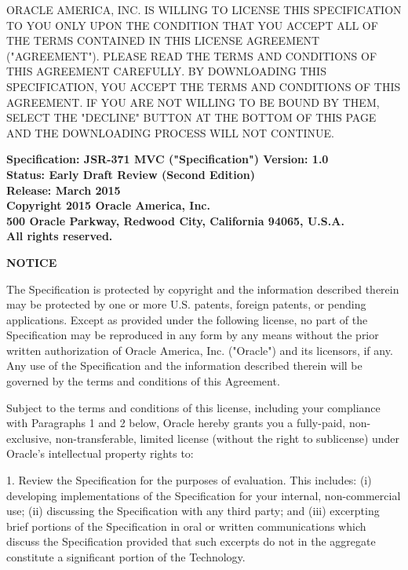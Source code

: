\begin{flushleft}

\vspace{1em}

ORACLE AMERICA, INC. IS WILLING TO LICENSE THIS SPECIFICATION TO YOU ONLY UPON THE CONDITION THAT YOU ACCEPT ALL OF THE TERMS CONTAINED IN THIS LICENSE AGREEMENT ("AGREEMENT"). PLEASE READ THE TERMS AND CONDITIONS OF THIS AGREEMENT CAREFULLY. BY DOWNLOADING THIS SPECIFICATION, YOU ACCEPT THE TERMS AND CONDITIONS OF THIS AGREEMENT. IF YOU ARE NOT WILLING TO BE BOUND BY THEM, SELECT THE "DECLINE" BUTTON AT THE BOTTOM OF THIS PAGE AND THE DOWNLOADING PROCESS WILL NOT CONTINUE. 

\vspace{1em}

{\bfseries
Specification: JSR-371 MVC ("Specification") Version: 1.0 \\
Status: Early Draft Review (Second Edition) \\
Release: March 2015 \\
Copyright 2015 Oracle America, Inc. \\
500 Oracle Parkway, Redwood City, California 94065, U.S.A. \\
All rights reserved.\\
}

\vspace{1em}
{\bfseries NOTICE}

The Specification is protected by copyright and the information described therein may be protected by one or more U.S. patents, foreign patents, or pending applications. Except as provided under the following license, no part of the Specification may be reproduced in any form by any means without the prior written authorization of Oracle America, Inc. ("Oracle") and its licensors, if any. Any use of the Specification and the information described therein will be governed by the terms and conditions of this Agreement.

Subject to the terms and conditions of this license, including your compliance with Paragraphs 1 and 2 below, Oracle hereby grants you a fully-paid, non-exclusive, non-transferable, limited license (without the right to sublicense) under Oracle's intellectual property rights to:

1. Review the Specification for the purposes of evaluation. This includes: (i) developing implementations of the Specification for your internal, non-commercial use; (ii) discussing the Specification with any third party; and (iii) excerpting brief portions of the Specification in oral or written communications which discuss the Specification provided that such excerpts do not in the aggregate constitute a significant portion of the Technology.


\end{flushleft}
